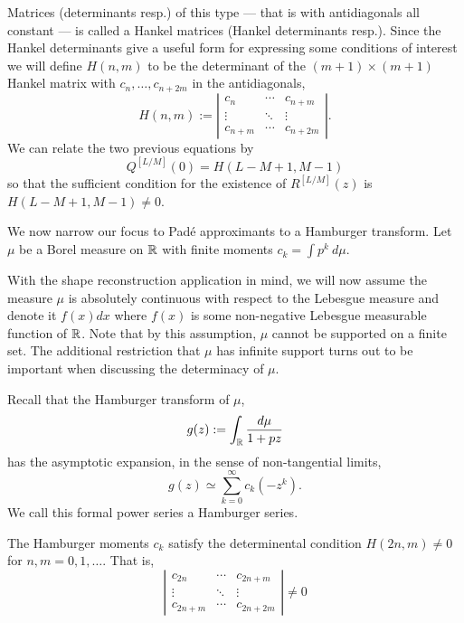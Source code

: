 Matrices (determinants resp.) of this type — that is with antidiagonals all constant — is called a Hankel matrices (Hankel determinants resp.).  Since the Hankel determinants give a useful form for expressing some conditions of interest we will define $H(n,m)$ to be the determinant of the $(m + 1) \times (m + 1)$ Hankel matrix with $c_n, \ldots, c_{n + 2m}$ in the antidiagonals,
\[
  H(n,m) :=
  \left|
  \begin{matrix}
    c_{n} & \cdots & c_{n+m} \\
    \vdots & \ddots & \vdots  \\
    c_{n+m} & \cdots & c_{n+2m} 
  \end{matrix}
  \right|.
\]
We can relate the two previous equations by
\[
  Q^{[L/M]}(0) = H(L - M + 1, M - 1)
\]
so that the sufficient condition for the existence of $R^{[L/M]}(z)$ is $H(L-M+1, M-1) \neq 0$.

We now narrow our focus to Pad\'e approximants to a Hamburger transform. Let $\mu$ be a Borel measure on $\mathbb{R}$ with finite moments $c_k = \int p^k ~d\mu$. 

With the shape reconstruction application in mind, we will now assume the measure $\mu$ is absolutely continuous with respect to the Lebesgue measure and denote it $f(x)dx$ where $f(x)$ is some non-negative Lebesgue measurable function of $\mathbb{R}$. Note that by this assumption, $\mu$ cannot be supported on a finite set. The additional restriction that $\mu$ has infinite support turns out to be important when discussing the determinacy of $\mu$.

Recall that the Hamburger transform of $\mu$,
\[
    g(z) := \int_{\mathbb{R}} \frac{d\mu}{1+pz}
\]
has the asymptotic expansion, in the sense of non-tangential limits,
\[
  g(z) \simeq \sum_{k=0}^\infty c_k (-z^k).
\]
We call this formal power series a Hamburger series. 


\begin{lemma}
  The Hamburger moments $c_k$ satisfy the determinental condition $H(2n, m) \neq 0$ for $n,m = 0, 1, \ldots$. That is,
  \[
    \left|
    \begin{matrix}
      c_{2n} & \cdots & c_{2n+m} \\
      \vdots & \ddots & \vdots  \\
      c_{2n+m} & \cdots & c_{2n+2m}
    \end{matrix}
    \right| \neq 0
  \]
\end{lemma}

